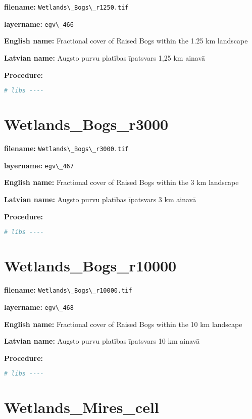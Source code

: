 \documentclass[
]{book}
\newcommand{\passthrough}[1]{#1}
\begin{document}
\textbf{filename:} \passthrough{\lstinline!Wetlands\_Bogs\_r1250.tif!}

\textbf{layername:} \passthrough{\lstinline!egv\_466!}

\textbf{English name:} Fractional cover of Raised Bogs within the 1.25 km landscape

\textbf{Latvian name:} Augsto purvu platības īpatsvars 1,25 km ainavā

\textbf{Procedure:}

\begin{lstlisting}[language=R]
# libs ----
\end{lstlisting}

\section{Wetlands\_Bogs\_r3000}\label{ch06.467}

\textbf{filename:} \passthrough{\lstinline!Wetlands\_Bogs\_r3000.tif!}

\textbf{layername:} \passthrough{\lstinline!egv\_467!}

\textbf{English name:} Fractional cover of Raised Bogs within the 3 km landscape

\textbf{Latvian name:} Augsto purvu platības īpatsvars 3 km ainavā

\textbf{Procedure:}

\begin{lstlisting}[language=R]
# libs ----
\end{lstlisting}

\section{Wetlands\_Bogs\_r10000}\label{ch06.468}

\textbf{filename:} \passthrough{\lstinline!Wetlands\_Bogs\_r10000.tif!}

\textbf{layername:} \passthrough{\lstinline!egv\_468!}

\textbf{English name:} Fractional cover of Raised Bogs within the 10 km landscape

\textbf{Latvian name:} Augsto purvu platības īpatsvars 10 km ainavā

\textbf{Procedure:}

\begin{lstlisting}[language=R]
# libs ----
\end{lstlisting}

\section{Wetlands\_Mires\_cell}\label{ch06.469}
\end{document}
